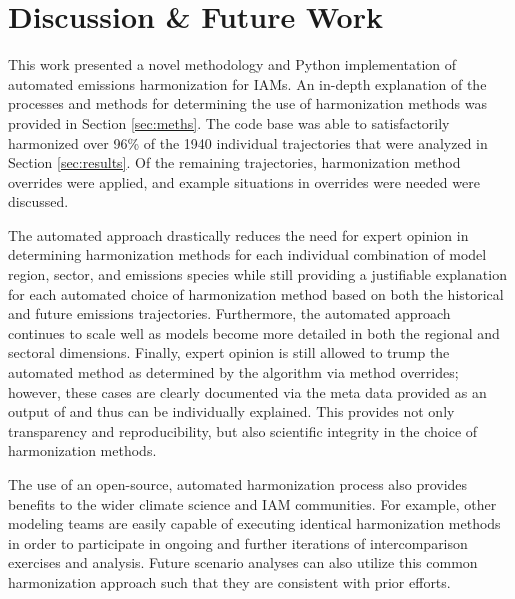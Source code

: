 \section{Discussion \& Future Work}\label{sec:future}

This work presented a novel methodology and Python implementation of automated
emissions harmonization for IAMs. An in-depth explanation of the processes and
methods for determining the use of harmonization methods was provided in Section
\ref{sec:meths}. The  code base was able to satisfactorily
harmonized over 96\% of the 1940 individual trajectories that were analyzed in
% 
% 
Section \ref{sec:results}. Of the remaining trajectories, harmonization method
overrides were applied, and example situations in overrides were needed
were discussed.

The automated approach drastically reduces the need for expert opinion in
determining harmonization methods for each individual combination of model
region, sector, and emissions species while still providing a justifiable
explanation for each automated choice of harmonization method based on both the
historical and future emissions trajectories. Furthermore, the automated
approach continues to scale well as models become more detailed in both the
regional and sectoral dimensions. Finally, expert opinion is still allowed to
trump the automated method as determined by the algorithm via method overrides;
however, these cases are clearly documented via the meta data provided as an
output of  and thus can be individually explained. This provides
not only transparency and reproducibility, but also scientific integrity in the
choice of harmonization methods.

The use of an open-source, automated harmonization process also provides
benefits to the wider climate science and IAM communities. For example, other
modeling teams are easily capable of executing identical harmonization methods
in order to participate in ongoing and further iterations of intercomparison
exercises and analysis. Future scenario analyses can also utilize this common
harmonization approach such that they are consistent with prior efforts.

